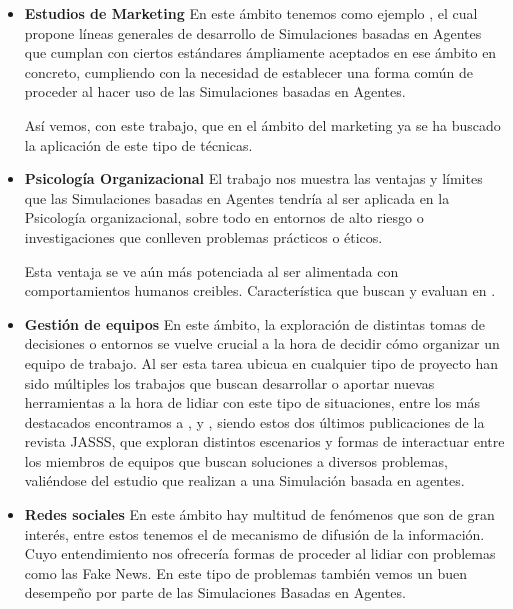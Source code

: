 \begin{itemize}
	\item \textbf{Estudios  de Marketing} En este ámbito tenemos como ejemplo \cite{rand2011agent}, el cual propone líneas generales de desarrollo de Simulaciones basadas en Agentes que cumplan con ciertos estándares ámpliamente aceptados en ese ámbito en concreto, cumpliendo con la necesidad de establecer una forma común de proceder al hacer uso de las Simulaciones basadas en Agentes.

Así vemos, con este trabajo, que en el ámbito del marketing ya se ha buscado la aplicación de este tipo de técnicas.
	\item \textbf{Psicología Organizacional} El trabajo \cite{hughes2012agent} nos muestra las ventajas y límites que las Simulaciones basadas en Agentes tendría al ser aplicada en la Psicología organizacional, sobre todo en entornos de alto riesgo o investigaciones que conlleven problemas prácticos o éticos.

Esta ventaja se ve aún más potenciada al ser alimentada con comportamientos humanos creibles. Característica que buscan y evaluan en \cite{park2023generative}.
	\item \textbf{Gestión de equipos} En este ámbito, la exploración de distintas tomas de decisiones o entornos se vuelve crucial a la hora de decidir cómo organizar un equipo de trabajo. Al ser esta tarea ubicua en cualquier tipo de proyecto han sido múltiples los trabajos que buscan desarrollar o aportar nuevas herramientas a la hora de lidiar con este tipo de situaciones, entre los más destacados encontramos a \cite{crowder2012development}, \cite{boroomand2021hard} y \cite{boroomand2023superiority}, siendo estos dos últimos publicaciones de la revista JASSS, que exploran distintos escenarios y formas de interactuar entre los miembros de equipos que buscan soluciones a diversos problemas, valiéndose del estudio que realizan a una Simulación basada en agentes.
	\item \textbf{Redes sociales} En este ámbito hay multitud de fenómenos que son de gran interés, entre estos tenemos el de mecanismo de difusión de la información. Cuyo entendimiento nos ofrecería formas de proceder al lidiar con problemas como las Fake News. En este tipo de problemas también vemos un buen desempeño por parte de las Simulaciones Basadas en Agentes.


\end{itemize}
